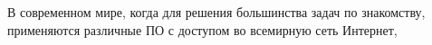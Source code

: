 \Introduction

В современном мире, когда для решения большинства задач по знакомству, применяются различные ПО с доступом во всемирную сеть Интернет, 